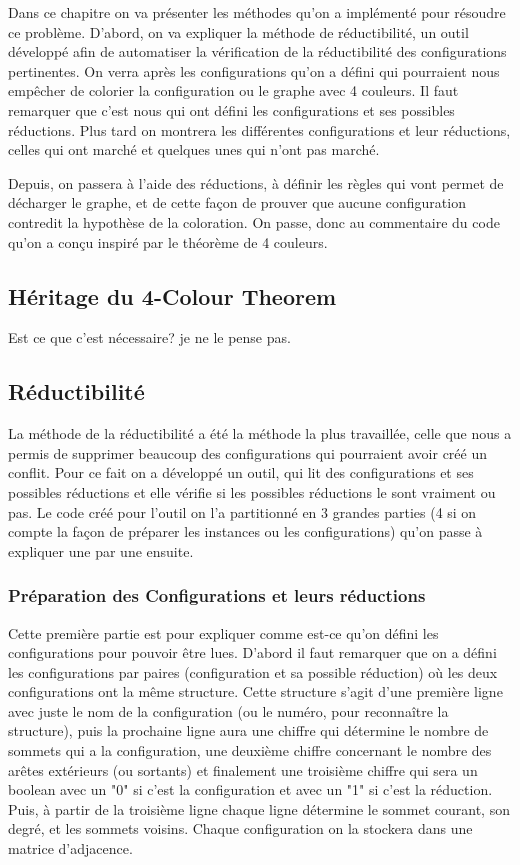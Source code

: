 \documentclass[10pt,a4paper]{article}
\begin{document}
Dans ce chapitre on va présenter les méthodes qu'on a implémenté pour résoudre ce problème. D'abord, on va expliquer la méthode de réductibilité, un outil développé afin de automatiser la vérification de la réductibilité des configurations pertinentes. On verra après les configurations qu'on a défini qui pourraient nous empêcher de colorier la configuration ou le graphe avec 4 couleurs. Il faut remarquer que c'est nous qui ont défini les configurations et ses possibles réductions. Plus tard on montrera les différentes configurations et leur réductions, celles qui ont marché et quelques unes qui n'ont pas marché. 

Depuis, on passera à l'aide des réductions, à définir les règles qui vont permet de décharger le graphe, et de cette façon de prouver que aucune configuration contredit la hypothèse de la coloration. On passe, donc au commentaire du code qu'on a conçu inspiré par le théorème de 4 couleurs.

\subsection{Héritage du 4-Colour Theorem}

Est ce que c'est nécessaire? je ne le pense pas.

\subsection{Réductibilité}

La méthode de la réductibilité a été la méthode la plus travaillée, celle que nous a permis de supprimer beaucoup des configurations qui pourraient avoir créé un conflit. Pour ce fait on a développé un outil, qui lit des configurations et ses possibles réductions et elle vérifie si les possibles réductions le sont vraiment ou pas. Le code créé pour l'outil on l'a partitionné en 3 grandes parties (4 si on compte la façon de préparer les instances ou les configurations) qu'on passe à expliquer une par une ensuite.

\subsubsection{Préparation des Configurations et leurs réductions}

Cette première partie est pour expliquer comme est-ce qu'on défini les configurations pour pouvoir être lues. D'abord il  faut remarquer que on a défini les configurations par paires (configuration et sa possible réduction) où les deux configurations ont la même structure. Cette structure s'agit d'une première ligne avec juste le nom de la configuration (ou le numéro, pour reconnaître la structure), puis la prochaine ligne aura une chiffre qui détermine le nombre de sommets qui a la configuration, une deuxième chiffre concernant le nombre des arêtes extérieurs (ou sortants) et finalement une troisième chiffre qui sera un boolean avec un "0" si c'est la configuration et avec un "1" si c'est la réduction. Puis, à partir de la troisième ligne chaque ligne détermine le sommet courant, son degré, et les sommets voisins. Chaque configuration on la stockera dans une matrice d'adjacence.
\end{document}
